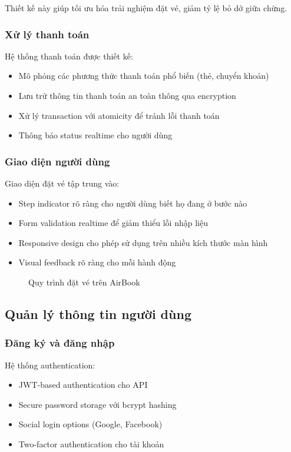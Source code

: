 Thiết kế này giúp tối ưu hóa trải nghiệm đặt vé, giảm tỷ lệ bỏ dở giữa chừng.

\subsubsection{Xử lý thanh toán}
Hệ thống thanh toán được thiết kế:

\begin{itemize}[leftmargin=1cm]
    \item Mô phỏng các phương thức thanh toán phổ biến (thẻ, chuyển khoản)
    \item Lưu trữ thông tin thanh toán an toàn thông qua encryption
    \item Xử lý transaction với atomicity để tránh lỗi thanh toán
    \item Thông báo status realtime cho người dùng
\end{itemize}

\subsubsection{Giao diện người dùng}
Giao diện đặt vé tập trung vào:

\begin{itemize}[leftmargin=1cm]
    \item Step indicator rõ ràng cho người dùng biết họ đang ở bước nào
    \item Form validation realtime để giảm thiểu lỗi nhập liệu
    \item Responsive design cho phép sử dụng trên nhiều kích thước màn hình
    \item Visual feedback rõ ràng cho mỗi hành động
\end{itemize}

\begin{figure}[H]
\centering
\caption{Quy trình đặt vé trên AirBook}
\end{figure}

\subsection{Quản lý thông tin người dùng}

\subsubsection{Đăng ký và đăng nhập}
Hệ thống authentication:

\begin{itemize}[leftmargin=1cm]
    \item JWT-based authentication cho API
    \item Secure password storage với bcrypt hashing
    \item Social login options (Google, Facebook)
    \item Two-factor authentication cho tài khoản
\end{itemize}

